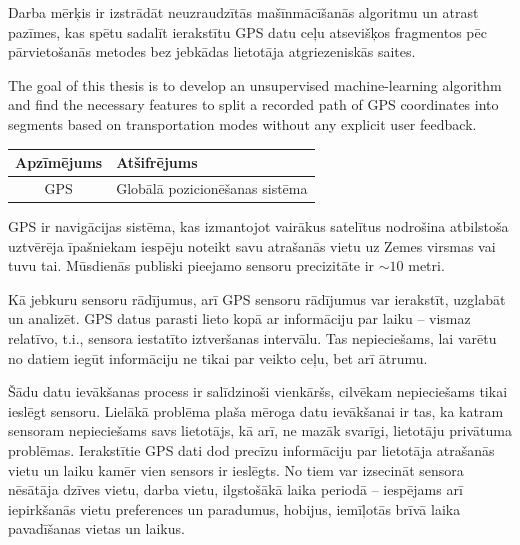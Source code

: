 \documentclass{ludis}
\begin{document}
\maketitle

\begin{abstract-lv}
  Darba mērķis ir izstrādāt neuzraudzītās mašīnmācīšanās algoritmu un atrast pazīmes, kas spētu
  sadalīt ierakstītu GPS datu ceļu atsevišķos fragmentos pēc pārvietošanās metodes bez jebkādas 
  lietotāja atgriezeniskās saites.
\end{abstract-lv}

\begin{abstract-en}
  The goal of this thesis is to develop an unsupervised machine-learning algo\-rithm and find the 
  necessary features to split a recorded path of GPS coordi\-nates into segments based on
  transportation modes without any explicit user feedback.
\end{abstract-en}

\tableofcontents

\setlength\LTleft{0pt}
\setlength\LTright{0pt}
\begin{longtable}{| c | p{28em} |}
  \hline
  \textbf{Apzīmējums} & \textbf{Atšifrējums}\\ 
  \endhead
  \hline
  GPS & Globālā pozicionēšanas sistēma\\
  \hline
\end{longtable}

GPS ir navigācijas sistēma, kas izmantojot vairākus satelītus nodrošina atbilstoša uztvērēja 
īpašniekam iespēju noteikt savu atrašanās vietu uz Zemes virsmas vai tuvu tai. Mūsdienās
publiski pieejamo sensoru precizitāte ir $\sim 10$ metri. 

Kā jebkuru sensoru rādījumus, arī GPS sensoru rādījumus var ierakstīt, uzglabāt un analizēt. GPS
datus parasti lieto kopā ar informāciju par laiku -- vismaz relatīvo, t.i., sensora iestatīto
iztveršanas intervālu. Tas nepieciešams, lai varētu no datiem iegūt informāciju ne tikai par 
veikto ceļu, bet arī ātrumu.

Šādu datu ievākšanas process ir salīdzinoši vienkāršs, cilvēkam nepieciešams tikai ieslēgt sensoru.
Lielākā problēma plaša mēroga datu ievākšanai ir tas, ka katram sensoram nepieciešams savs 
lietotājs, kā arī, ne mazāk svarīgi, lietotāju privātuma problēmas. Ierakstītie GPS dati dod
precīzu informāciju par lietotāja atrašanās vietu un laiku kamēr vien sensors ir ieslēgts. 
No tiem var izsecināt sensora nēsātāja dzīves vietu, darba vietu, ilgstošākā laika periodā -- 
iespējams arī iepirkšanās vietu preferences un paradumus, hobijus, iemīļotās brīvā laika 
pavadīšanas vietas un laikus.
\end{document}
